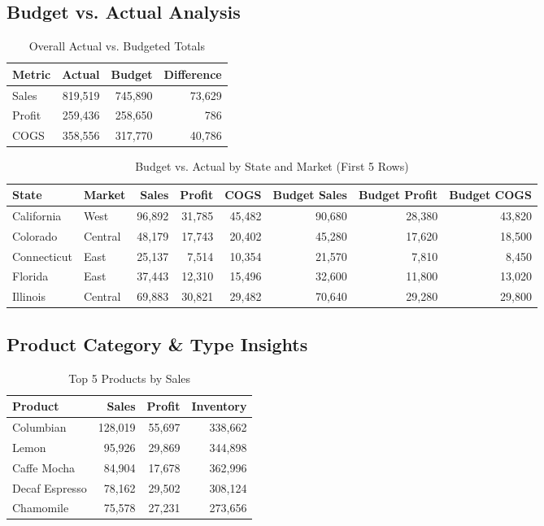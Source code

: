 \documentclass[11pt]{article}
\begin{document}
\subsection{Budget vs. Actual Analysis}
\begin{table}[H]
\centering
\caption{Overall Actual vs. Budgeted Totals}
\begin{tabular}{lrrr}
\toprule
Metric & Actual & Budget & Difference \\
\midrule
Sales  & 819,519 & 745,890 & 73,629 \\
Profit & 259,436 & 258,650 & 786 \\
COGS   & 358,556 & 317,770 & 40,786 \\
\bottomrule
\end{tabular}
\end{table}

\begin{table}[H]
\centering
\caption{Budget vs. Actual by State and Market (First 5 Rows)}
\begin{tabular}{llrrrrrr}
\toprule
State & Market & Sales & Profit & COGS & Budget Sales & Budget Profit & Budget COGS \\
\midrule
California & West & 96,892 & 31,785 & 45,482 & 90,680 & 28,380 & 43,820 \\
Colorado & Central & 48,179 & 17,743 & 20,402 & 45,280 & 17,620 & 18,500 \\
Connecticut & East & 25,137 & 7,514 & 10,354 & 21,570 & 7,810 & 8,450 \\
Florida & East & 37,443 & 12,310 & 15,496 & 32,600 & 11,800 & 13,020 \\
Illinois & Central & 69,883 & 30,821 & 29,482 & 70,640 & 29,280 & 29,800 \\
\bottomrule
\end{tabular}
\end{table}

\subsection{Product Category \& Type Insights}
\begin{table}[H]
\centering
\caption{Top 5 Products by Sales}
\begin{tabular}{lrrr}
\toprule
Product & Sales & Profit & Inventory \\
\midrule
Columbian      & 128,019 & 55,697 & 338,662 \\
Lemon          & 95,926  & 29,869 & 344,898 \\
Caffe Mocha    & 84,904  & 17,678 & 362,996 \\
Decaf Espresso & 78,162  & 29,502 & 308,124 \\
Chamomile      & 75,578  & 27,231 & 273,656 \\
\bottomrule
\end{tabular}
\end{table}
\end{document}
